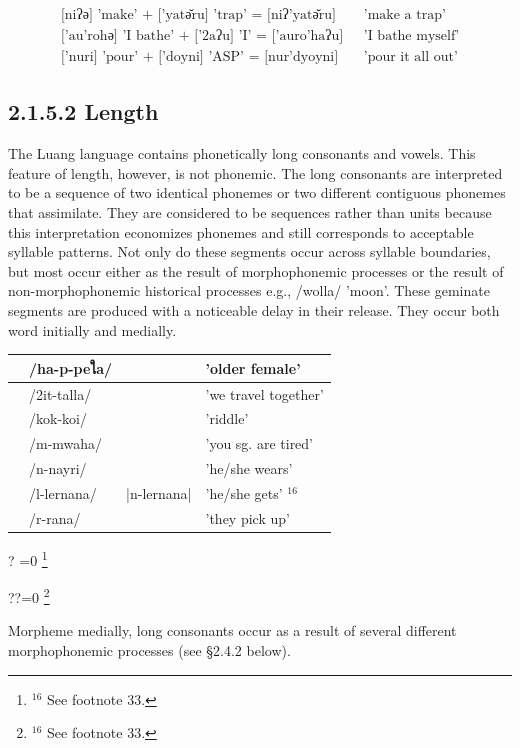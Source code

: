 \documentclass[10pt]{article}
\let\svthefootnote\thefootnote
\newcommand\blfootnotetext[1]{%
  \let\thefootnote\relax\footnote{#1}%
  \addtocounter{footnote}{-1}%
  \let\thefootnote\svthefootnote%
}
\let\svfootnotetext\footnotetext
\renewcommand\footnotetext[2][?]{%
  \if\relax#1\relax%
    \ifnum\value{footnote}=0\blfootnotetext{#2}\else\svfootnotetext{#2}\fi%
  \else%
    \if?#1\ifnum\value{footnote}=0\blfootnotetext{#2}\else\svfootnotetext{#2}\fi%
    \else\svfootnotetext[#1]{#2}\fi%
  \fi
}
\begin{document}
\[
\begin{array}{ll}
\text { [niʔə] 'make' + ['yatə̆ru] 'trap' = [niʔ'yatə̆ru] } & \text { 'make a trap' } \\
\text { ['au'rohə] 'I bathe' + ['2aʔu] 'I' = ['auro'haʔu] } & \text { 'I bathe myself' } \\
\text { ['nuri] 'pour' + ['doyni] 'ASP' = [nur'dyoyni] } & \text { 'pour it all out' }
\end{array}
\]

\subsection*{2.1.5.2 Length}
The Luang language contains phonetically long consonants and vowels. This feature of length, however, is not phonemic. The long consonants are interpreted to be a sequence of two identical phonemes or two different contiguous phonemes that assimilate. They are considered to be sequences rather than units because this interpretation economizes phonemes and still corresponds to acceptable syllable patterns. Not only do these segments occur across syllable boundaries, but most occur either as the result of morphophonemic processes or the result of non-morphophonemic historical processes e.g., /wolla/ 'moon'. These geminate segments are produced with a noticeable delay in their release. They occur both word initially and medially.

\begin{center}
\begin{tabular}{|l|l|l|l|}
\hline
[hap'peใә] & /ha-p-peใa/ &  & 'older female' \\
\hline
[2it'tallə] & /2it-talla/ &  & 'we travel together' \\
\hline
[kok'koi] & /kok-koi/ &  & 'riddle' \\
\hline
[ṃ'mwahə] & /m-mwaha/ &  & 'you sg. are tired' \\
\hline
[ņ'nayri] & /n-nayri/ &  & 'he/she wears' \\
\hline
[̣ller'nanə] & /l-lernana/ & |n-lernana| & 'he/she gets' \({ }^{16}\) \\
\hline
[ŗ'rana] & /r-rana/ &  & 'they pick up' \\
\hline
\end{tabular}
\end{center}

Morpheme medially, long consonants occur as a result of several different morphophonemic processes (see §2.4.2 below).
\end{document}
